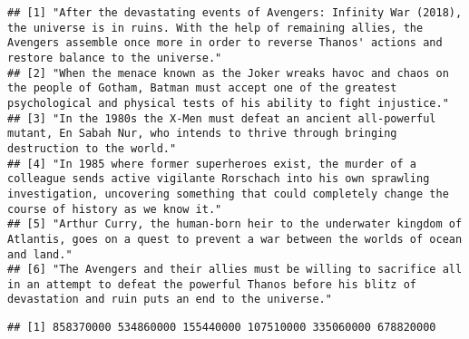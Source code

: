 \documentclass[]{article}
\newenvironment{Shaded}{\begin{snugshade}}{\end{snugshade}}
\newcommand{\CharTok}[1]{\textcolor[rgb]{0.31,0.60,0.02}{#1}}
\newcommand{\CommentTok}[1]{\textcolor[rgb]{0.56,0.35,0.01}{\textit{#1}}}
\newcommand{\FloatTok}[1]{\textcolor[rgb]{0.00,0.00,0.81}{#1}}
\newcommand{\KeywordTok}[1]{\textcolor[rgb]{0.13,0.29,0.53}{\textbf{#1}}}
\newcommand{\NormalTok}[1]{#1}
\newcommand{\OperatorTok}[1]{\textcolor[rgb]{0.81,0.36,0.00}{\textbf{#1}}}
\newcommand{\StringTok}[1]{\textcolor[rgb]{0.31,0.60,0.02}{#1}}
\begin{document}
\begin{verbatim}
## [1] "After the devastating events of Avengers: Infinity War (2018), the universe is in ruins. With the help of remaining allies, the Avengers assemble once more in order to reverse Thanos' actions and restore balance to the universe."
## [2] "When the menace known as the Joker wreaks havoc and chaos on the people of Gotham, Batman must accept one of the greatest psychological and physical tests of his ability to fight injustice."                                       
## [3] "In the 1980s the X-Men must defeat an ancient all-powerful mutant, En Sabah Nur, who intends to thrive through bringing destruction to the world."                                                                                   
## [4] "In 1985 where former superheroes exist, the murder of a colleague sends active vigilante Rorschach into his own sprawling investigation, uncovering something that could completely change the course of history as we know it."     
## [5] "Arthur Curry, the human-born heir to the underwater kingdom of Atlantis, goes on a quest to prevent a war between the worlds of ocean and land."                                                                                     
## [6] "The Avengers and their allies must be willing to sacrifice all in an attempt to defeat the powerful Thanos before his blitz of devastation and ruin puts an end to the universe."
\end{verbatim}

\begin{Shaded}
\end{Shaded}

\begin{verbatim}
## [1] 858370000 534860000 155440000 107510000 335060000 678820000
\end{verbatim}
\end{document}
